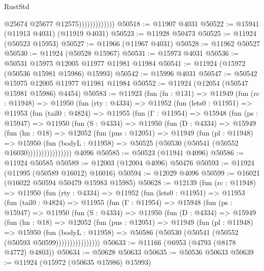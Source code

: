 \begin{lexlean}{RustStd}
\begin{coremodule}
                              @25674
                              @25677
                              @12575)))))))))))))
@50518 := @11907 @4031
@50522 := @15941 (@11913 @4031) (@11919 @4031)
@50523 := @11928 @50473
@50525 := @11924 (@50523 @15953)
@50527 := @11966 (@11967 @4031)
@50528 := @11962 @50527
@50530 := @11924 (@50528 @15967)
@50531 := @15973 @4031
@50536 := @50531 @15975 @12005 @11977 @11981 @11984
@50541 := @11924 (@15972 (@50536 @15981 @15986) @15993)
@50542 := @15996 @4031
@50547 := @50542 @15975 @12005 @11977 @11981 @11984
@50552 := @11924 (@12054 (@50547 @15981 @15986) @4454)
@50583 := @11923
    (fun (fn : @131) =>
    @11949
      (fun (rc : @11948) =>
      @11950
        (fun (rty : @4334) =>
        @11952
          (fun (lets0 : @11951) =>
          @11953
            (fun (tail0 : @4824) =>
            @11955
              (fun (Γ : @11954) =>
              @15948
                (fun (ps : @15947) =>
                @11950
                  (fun (S : @4334) =>
                  @11950
                    (fun (D : @4334) =>
                    @15949
                      (fun (hn : @18) =>
                      @12052
                        (fun (pns : @12051) =>
                        @11949
                          (fun (pl : @11948) =>
                          @15950
                            (fun (bodyL : @11958) =>
                            @50525 (@50530 (@50541 (@50552 @16030))))))))))))))))
    @4096
@50585 := @50523 (@11941 @4096)
@50586 := @11924 @50585
@50589 := @12003 (@12004 @4096) @50476
@50593 := @11924 (@11995 (@50589 @16012) @16016)
@50594 := @12029 @4096
@50599 := @16021 (@16022 @50594 @50479 @15983 @15985)
@50628 := @12139
    (fun (rc : @11948) =>
    @11950
      (fun (rty : @4334) =>
      @11952
        (fun (lets0 : @11951) =>
        @11953
          (fun (tail0 : @4824) =>
          @11955
            (fun (Γ : @11954) =>
            @15948
              (fun (ps : @15947) =>
              @11950
                (fun (S : @4334) =>
                @11950
                  (fun (D : @4334) =>
                  @15949
                    (fun (hn : @18) =>
                    @12052
                      (fun (pns : @12051) =>
                      @11949
                        (fun (pl : @11948) =>
                        @15950
                          (fun (bodyL : @11958) =>
                          @50586 (@50530 (@50541 (@50552 (@50593 @50599))))))))))))))))
@50633 := @11166 (@6953 (@4793 (@8178 @4772) @4803))
@50634 := @50628 @50633
@50635 := @50536 @50633
@50639 := @11924 (@15972 (@50635 @15986) @15993)

\end{coremodule}
\end{lexlean}
